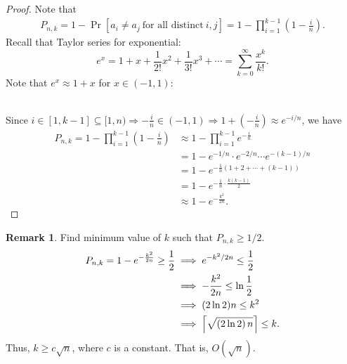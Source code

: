 \documentclass[12pt,openany]{book}
\DeclarePairedDelimiter{\ceil}{\lceil}{\rceil}
\DeclarePairedDelimiter{\floor}{\lfloor}{\rfloor}
\theoremstyle{definition}
\newtheorem{remark}{Remark}[chapter]
\newcommand{\of}[1]{\left( #1 \right)}
\begin{document}
	\begin{proof}
		Note that \begin{align*}
		P_{n,k}=1-\Pr[a_i\neq a_j\ \text{for all distinct}\ i,j]=1-\prod_{i=1}^{k-1}\of{1-\frac{i}{n}}.
		\end{align*} Recall that Taylor series for exponential: \[
		e^x=1+x+\frac{1}{2!}x^2+\frac{1}{3!}x^3+\cdots=\sum_{k=0}^{\infty}\frac{x^k}{k!}.
		\] Note that $e^x\approx1+x$ for $x\in(-1,1)$:
		\begin{figure}[ht!]
			\centering
		\end{figure}\\
		Since $i\in[1,k-1]\subseteq[1,n)\Rightarrow-\frac{i}{n}\in\of{-1,1}\Rightarrow 1+\of{-\frac{i}{n}}\approx e^{-i/n}$, we have \begin{align*}
		P_{n,k}=
		1-\prod_{i=1}^{k-1}\of{1-\frac{i}{n}}
		&\approx 1-\prod_{i=1}^{k-1}e^{-\frac{i}{n}}\\
		&=1-e^{-1/n}\cdot e^{-2/n}\cdots e^{-(k-1)/n}\\
		&=1-e^{-\frac{1}{n}\of{1+2+\cdots+(k-1)}}\\
		&=1-e^{-\frac{1}{n}\cdot\frac{k\of{k-1}}{2}}\\
		&\approx 1-e^{-\frac{k^2}{2n}}.
		\end{align*}
	\end{proof}
	
	\begin{remark}
		Find minimum value of $k$ such that $P_{n,k}\geq 1/2$. \begin{align*}
		P_{n,k}=1-e^{-\frac{k^2}{2n}}\geq\frac{1}{2}&\implies e^{-k^2/2n}\leq\frac{1}{2}\\
		&\implies-\frac{k^2}{2n}\leq\ln\frac{1}{2}\\
		&\implies (2\ln2)n\leq k^2\\
		&\implies \ceil*{\sqrt{\of{2\ln 2}n}}\leq k.
		\end{align*} 
		Thus, $k\geq c\sqrt{n}$, where $c$ is a constant. That is, $O(\sqrt{n})$.
	\end{remark}
	
	\iffalse
	\begin{remark}
		Find the upper bound of $P_{n,k}$. \begin{align*}
		P_{n,k}
		&=\Pr\left[(a_1=a_2)\lor\cdots\lor(a_1=a_k)\lor(a_2=a_3)\lor\cdots\lor(a_{k-1}=a_k)\right]\\
		&\leq\sum_{1\leq i< j\leq k}\Pr\left[a_i=a_j\right]\\
		&=\binom{k}{2}\frac{1}{n}\\
		&\leq\frac{k^2}{2n}.
		\end{align*} Thus, the upper bound of $P_{n,k}$ is less than 1/2 when $k=\floor*{\sqrt{n}}$.
	\end{remark}
	\fi
	
\end{document}
